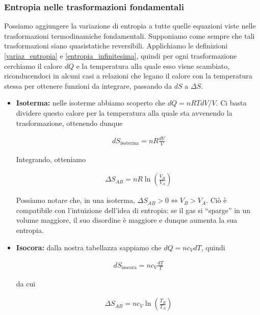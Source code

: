 \subsubsection{Entropia nelle trasformazioni fondamentali}
Possiamo aggiungere la variazione di entropia a tutte quelle equazioni viste nelle
trasformazioni termodinamiche fondamentali. Supponiamo come sempre
che tali trasformazioni siano quasistatiche reversibili. Applichiamo
le definizioni \ref{variaz_entropia} e \ref{entropia_infinitesima},
quindi per ogni trasformazione cerchiamo il calore $dQ$ e
la temperatura alla quale esso viene scambiato, riconducendoci
in alcuni casi a relazioni che legano il calore con la temperatura
stessa per ottenere funzioni da integrare, passando da $dS$ a $\Delta S$.

\begin{itemize}
    \item \textbf{Isoterma:} nelle isoterme abbiamo scoperto che
    $dQ = nRTdV/V$. Ci basta dividere questo calore per la temperatura
    alla quale sta avvenendo la trasformazione, ottenendo dunque
    
    \begin{align}
        dS_\text{isoterma} = nR\frac{dV}{V}
    \end{align}

    \noindent Integrando, otteniamo

    \begin{align}
        \Delta S_{AB} = nR\ln\left(\frac{V_B}{V_A}\right)
    \end{align}

    \noindent Possiamo notare che, in una isoterma, $\Delta S_{AB} > 0 \Leftrightarrow V_B > V_A$.
    Ciò è compatibile con l'intuizione dell'idea di entropia: se il gas
    si ``sparge'' in un volume maggiore, il suo disordine è maggiore e
    dunque aumenta la sua entropia.

    \item \textbf{Isocora:} dalla nostra tabellazza sappiamo che $dQ = nc_VdT$,
    quindi

    \begin{align}
        dS_\text{isocora} = nc_V\frac{dT}{T}
    \end{align}

    \noindent da cui

    \begin{align}
        \Delta S_{AB} = nc_V\ln\left(\frac{T_B}{T_A}\right)
    \end{align}


\end{itemize}
